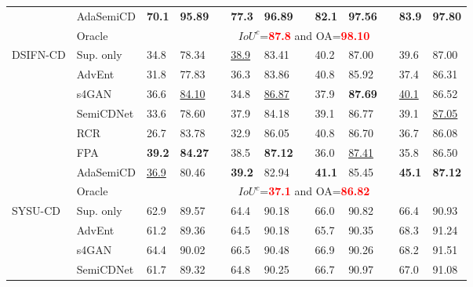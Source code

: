 \documentclass[lang=chs, degree=master, blindreview=false, adobe=false]{yanputhesis}
\begin{document}
\begin{table}[!htbp]
{\begin{tabular}{p{20mm}p{20mm}p{8mm}p{8mm}cp{8mm}p{8mm}cp{8mm}p{8mm}cp{8mm}p{8mm}}
      \multirow{-8}{*}{\cellcolor{white}}& \cellcolor{white}AdaSemiCD   &   \textbf{70.1} & \textbf{95.89} && \textbf{77.3} & \textbf{96.89} && \textbf{82.1} & \textbf{97.56} && \textbf{83.9} & \textbf{97.80} \\%
      \cline{2-13}
      & Oracle & \multicolumn{11}{c}{$ IoU^c$=\textcolor{red}{\bf 87.8} and OA=\textcolor{red}{\bf 98.10}} \\
      \bottomrule
      \multirow{8}{*}{DSIFN-CD}
      & Sup. only   &   34.8 & 78.34 && \underline{38.9} & 83.41 && 40.2 & 87.00 && 39.6 & 87.00 \\ %
      & AdvEnt\cite{vu2019advent}& 31.8 & 77.83 && 36.3 & 83.86 && 40.8 & 85.92 && 37.4 & 86.31 \\ %
      & s4GAN\cite{mittal2019semi}& 36.6 & \underline{84.10} && 34.8 & \underline{86.87} && 37.9 & \cellcolor{mycyan}\textbf{87.69} && \underline{40.1} & 86.52 \\
      & SemiCDNet\cite{peng2021SemiCDNet} & 33.6 & 78.60 && 37.9 & 84.18 && 39.1 & 86.77 && 39.1 & \underline{87.05} \\ %
      & RCR\cite{bandara2022RCR}& 26.7 & 83.78 && 32.9 & 86.05 && 40.8 & 86.70 && 36.7 & 86.08 \\
      & FPA\cite{Zhang2023FPA}& \cellcolor{mycyan}\textbf{39.2} & \cellcolor{mycyan}\textbf{84.27} && 38.5 & \cellcolor{mycyan}\textbf{87.12} && 36.0 & \underline{87.41} && 35.8 & 86.50 \\
      \multirow{-8}{*}{\cellcolor{white}}& \cellcolor{white}AdaSemiCD   &   \cellcolor{white}\underline{36.9} & \cellcolor{white}80.46 && \cellcolor{mycyan}\textbf{39.2} & 82.94 && \cellcolor{mycyan}\textbf{41.1} & 85.45 && \cellcolor{mycyan}\textbf{45.1} & \cellcolor{mycyan}\textbf{87.12} \\%
      \cline{2-13}
      & Oracle & \multicolumn{11}{c}{$ IoU^c$=\textcolor{red}{\bf 37.1} and OA=\textcolor{red}{\bf 86.82}} \\
      \bottomrule
      \multirow{8}{*}{SYSU-CD}
      & Sup. only   &   62.9 & 89.57 && 64.4 & 90.18 && 66.0 & 90.82 && 66.4 & 90.93 \\ %
      & AdvEnt\cite{vu2019advent}& 61.2 & 89.36 && 64.5 & 90.18 && 65.7 & 90.35 && 68.3 & 91.24 \\ %
      & s4GAN\cite{mittal2019semi}& 64.4 & 90.02 && 66.5 & 90.48 && 66.9 & 90.26 && 68.2 & 91.51 \\
      & SemiCDNet\cite{peng2021SemiCDNet} & 61.7 & 89.32 && 64.8 & 90.25 && 66.7 & 90.97 && 67.0 & 91.08 \\ %

\end{tabular}}
\end{table}
\end{document}
